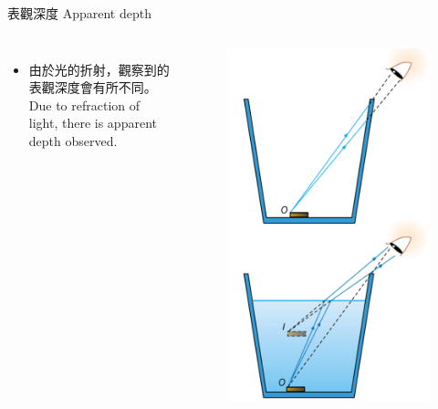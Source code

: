 \documentclass[beamer=true]{standalone}
\begin{document}
\begin{frame}{表觀深度 Apparent depth}
    \begin{columns}
        \begin{itemize}
        \setlength{\itemsep}{.6em}
            \item 由於光的折射，觀察到的表觀深度會有所不同。\\ Due to refraction of light, there is apparent depth observed.
        \end{itemize}
        \begin{figure}
            \centering
            \includegraphics[width=.8\linewidth]{assets/q8ud9823du9n32d832.png}
            
            
        \end{figure}
    \end{columns}
\end{frame}
\end{document}
